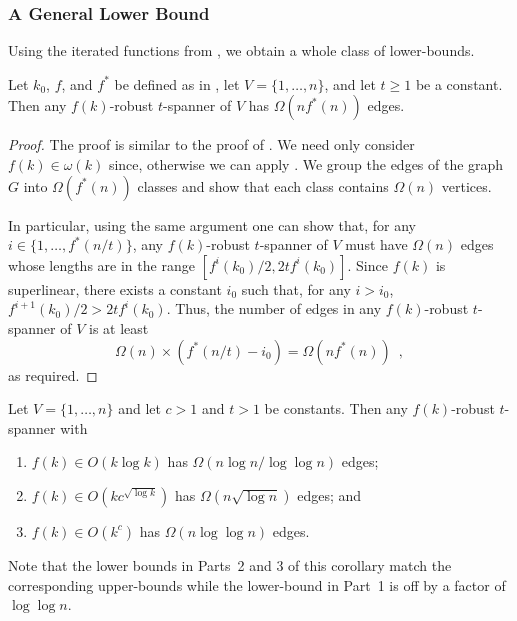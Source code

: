 \documentclass{sig-alternate}
\begin{document}
\subsubsection{A General Lower Bound}

Using the iterated functions from , we obtain a whole
class of lower-bounds.

\begin{thm}
  Let $k_0$, $f$, and $f^*$ be defined as in ,
  let $V=\{1,\ldots,n\}$, and let $t\ge 1$ be a constant.  Then any
  $f(k)$-robust $t$-spanner of $V$ has $\Omega(nf^*(n))$ edges.
\end{thm}

\begin{proof}
  The proof is similar to the proof of .
  We need only consider $f(k)\in\omega(k)$ since, otherwise we can apply
  .  We group the edges of the graph
  $G$ into $\Omega(f^*(n))$ classes and show that each class contains
  $\Omega(n)$ vertices.  

  In particular, using the same argument one can show that, for
  any $i\in\{1,\ldots,f^*(n/t)\}$, any $f(k)$-robust $t$-spanner
  of $V$ must have $\Omega(n)$ edges whose lengths are in the range
  $[f^i(k_0)/2,2tf^i(k_0)]$.  Since $f(k)$ is superlinear, there exists
  a constant $i_0$ such that, for any $i>i_0$, $f^{i+1}(k_0)/2 > 2tf^i(k_0)$.
  Thus, the number of edges in any $f(k)$-robust $t$-spanner of $V$ is at least
  \[  \Omega(n) \times (f^*(n/t)-i_0) = \Omega(n f^*(n)) \enspace , \]
  as required.
\end{proof}

\begin{cor}
  Let $V=\{1,\ldots,n\}$ and let $c>1$ and $t>1$ be constants.  Then any
  $f(k)$-robust $t$-spanner with
  \begin{enumerate}
    \item $f(k)\in O(k\log k)$ has $\Omega(n\log n/\log\log n)$ edges;
    \item $f(k)\in O(kc^{\sqrt{\log k}})$ has $\Omega(n\sqrt{\log n})$
      edges; and
    \item $f(k)\in O(k^{c})$ has $\Omega(n\log\log n)$ edges.
  \end{enumerate}
\end{cor}

Note that the lower bounds in Parts~2 and 3 of this corollary match the
corresponding upper-bounds while the lower-bound in Part~1 is off by a
factor of $\log\log n$.
\end{document}
